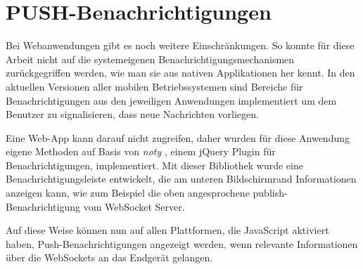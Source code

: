 \section{PUSH-Benachrichtigungen}
Bei Webanwendungen gibt es noch weitere Einschränkungen. So konnte für diese Arbeit nicht auf die systemeigenen Benachrichtigungsmechanismen zurückgegriffen werden, wie man sie aus nativen Applikationen her kennt. In den aktuellen Versionen aller mobilen Betriebssystemen sind Bereiche für Benachrichtigungen aus den jeweiligen Anwendungen implementiert um dem Benutzer zu signalisieren, dass neue Nachrichten vorliegen.\par

Eine Web-App kann darauf nicht zugreifen, daher wurden für diese Anwendung eigene Methoden auf Basis von \emph{noty} \cite{noty}, einem jQuery Plugin für Benachrichtigungen, implementiert. Mit dieser Bibliothek wurde eine Benachrichtigungsleiste entwickelt, die am unteren Bildschirmrand Informationen anzeigen kann, wie zum Beispiel die oben angesprochene publish-Benachrichtigung vom WebSocket Server.\par

Auf diese Weise können nun auf allen Plattformen, die JavaScript aktiviert haben, Push-Benachrichtigungen angezeigt werden, wenn relevante Informationen über die WebSockets an das Endgerät gelangen.
